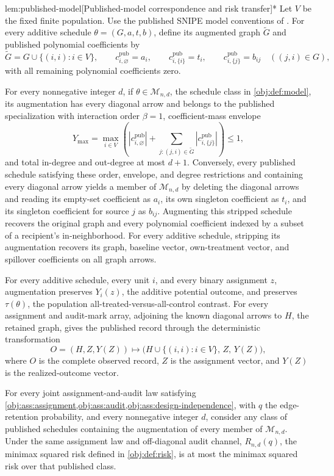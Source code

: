 \documentclass[11pt]{article}
\begin{document}
\begin{propositionv}{lem:published-model}[Published-model correspondence and risk transfer]*
Let \(V\) be the fixed finite population. Use the published SNIPE model conventions of \citep[Sections 3.1--3.2, Assumptions 1--2, equations (3.2)--(3.3)]{CortezRodriguezEichhornYu2023SNIPE}. For every additive schedule \(\theta=(G,a,t,b)\), define its augmented graph \(\widetilde G\) and published polynomial coefficients by
\[
\widetilde G=G\cup\{(i,i):i\in V\},\qquad
c^{\mathrm{pub}}_{i,\varnothing}=a_i,\qquad
c^{\mathrm{pub}}_{i,\{i\}}=t_i,\qquad
c^{\mathrm{pub}}_{i,\{j\}}=b_{ij}\quad ((j,i)\in G),
\]
with all remaining polynomial coefficients zero.

For every nonnegative integer \(d\), if \(\theta\in\mathcal M_{n,d}\), the schedule class in \cref{obj:def:model}, its augmentation has every diagonal arrow and belongs to the published specialization with interaction order \(\beta=1\), coefficient-mass envelope
\[
Y_{\max}
=\max_{i\in V}
\left(
|c^{\mathrm{pub}}_{i,\varnothing}|
+\sum_{j:(j,i)\in\widetilde G}
|c^{\mathrm{pub}}_{i,\{j\}}|
\right)
\le 1,
\]
and total in-degree and out-degree at most \(d+1\). Conversely, every published schedule satisfying these order, envelope, and degree restrictions and containing every diagonal arrow yields a member of \(\mathcal M_{n,d}\) by deleting the diagonal arrows and reading its empty-set coefficient as \(a_i\), its own singleton coefficient as \(t_i\), and its singleton coefficient for source \(j\) as \(b_{ij}\). Augmenting this stripped schedule recovers the original graph and every polynomial coefficient indexed by a subset of a recipient's in-neighborhood. For every additive schedule, stripping its augmentation recovers its graph, baseline vector, own-treatment vector, and spillover coefficients on all graph arrows.

For every additive schedule, every unit \(i\), and every binary assignment \(z\), augmentation preserves \(Y_i(z)\), the additive potential outcome, and preserves \(\tau(\theta)\), the population all-treated-versus-all-control contrast. For every assignment and audit-mark array, adjoining the known diagonal arrows to \(H\), the retained graph, gives the published record through the deterministic transformation
\[
O=(H,Z,Y(Z))
\longmapsto
\bigl(H\cup\{(i,i):i\in V\},\,Z,\,Y(Z)\bigr),
\]
where \(O\) is the complete observed record, \(Z\) is the assignment vector, and \(Y(Z)\) is the realized-outcome vector.

For every joint assignment-and-audit law satisfying \cref{obj:ass:assignment,obj:ass:audit,obj:ass:design-independence}, with \(q\) the edge-retention probability, and every nonnegative integer \(d\), consider any class of published schedules containing the augmentation of every member of \(\mathcal M_{n,d}\). Under the same assignment law and off-diagonal audit channel, \(R_{n,d}(q)\), the minimax squared risk defined in \cref{obj:def:risk}, is at most the minimax squared risk over that published class.
\end{propositionv}
\end{document}

